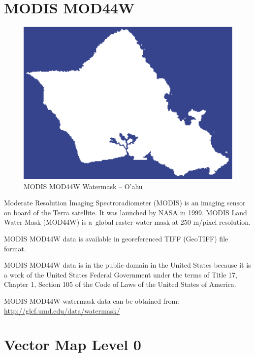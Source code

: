\section{MODIS MOD44W}

\begin{figure}[h!]
  \centering
  \includegraphics[width=120mm]{eps/mod44w_oahu.eps}
  \caption{MODIS MOD44W Watermask -- O'ahu}
\end{figure}

Moderate Resolution Imaging Spectroradiometer (MODIS) is an imaging sensor on board of the Terra satellite. It was launched by NASA in 1999. MODIS Land Water Mask (MOD44W) is a global raster water mask at 250 m/pixel resolution.

MODIS MOD44W data is available in georeferenced TIFF (GeoTIFF) file format.

MODIS MOD44W data is in the public domain in the United States because it is a work of the United States Federal Government under the terms of Title 17, Chapter 1, Section 105 of the Code of Laws of the United States of America.

MODIS MOD44W watermask data can be obtained from: \cite{Terrain-WaterMaskGLCF} \\
\url{http://glcf.umd.edu/data/watermask/}

\section{Vector Map Level 0}

